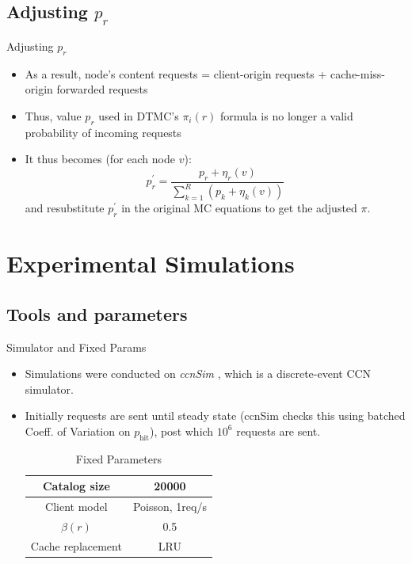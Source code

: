 \documentclass[
	xcolor={svgnames},
	hyperref={pagebackref,bookmarks},
	aspectratio=43,
]{beamer}
\begin{document}
\subsection*{Adjusting $p_r$}
\begin{frame}{Adjusting $p_r$}
    \begin{itemize}
        \item As a result, node's content requests = client-origin requests + cache-miss-origin forwarded requests 
        \item Thus, value $p_r$ used in DTMC's $\pi_i(r)$ formula is no longer a valid probability of incoming requests
        \item It thus becomes (for each node $v$): 
        \begin{equation}
            p_r^\prime = \frac{p_r + \eta_r(v)}{\sum_{k=1}^R\left(p_k + \eta_k(v) \right)}
        \end{equation}
        and resubstitute $p_r^\prime$ in the original MC equations to get the adjusted $\pi$.
    \end{itemize}
\end{frame}

\section{Experimental Simulations}
\subsection*{Tools and parameters}
\begin{frame}{Simulator and Fixed Params}
    \begin{itemize}
        \item Simulations were conducted on \textit{ccnSim} \footnotemark, which is a discrete-event CCN simulator.
        \item Initially requests are sent until steady state (ccnSim checks this using batched Coeff. of Variation on $p_{\text{hit}}$), post which $10^6$ requests are sent. 
        \vspace{10pt}
        \begin{table}[]
            \centering
            \begin{tabular}{c|c}
            \hline
               Catalog size  & 20000 \\
               \hline
               Client model  & Poisson, 1req/s \\
               \hline
               $\beta(r)$  &  0.5 \\
               \hline
               Cache replacement  &  LRU \\
               \hline
            \end{tabular}
            \caption{Fixed Parameters}
            \label{tab:my_label}
        \end{table}
    \end{itemize}
\end{frame}
\end{document}
